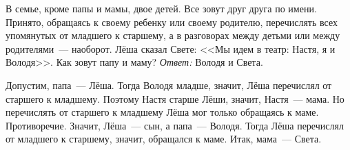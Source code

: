 \problem{}
В семье, кроме папы и мамы, двое детей.
Все зовут друг друга по имени.
Принято, обращаясь к своему ребенку или своему родителю, перечислять всех
упомянутых от младшего к старшему,
а в разговорах между детьми или между родителями~--- наоборот.
Лёша сказал Свете: <<Мы идем в театр: Настя, я и Володя>>.
Как зовут папу и маму?
\solution
\emph{Ответ:} Володя и Света.
\par
Допустим, папа~--- Лёша.
Тогда Володя младше, значит, Лёша перечислял от старшего к младшему.
Поэтому Настя старше Лёши, значит, Настя~--- мама.
Но перечислять от старшего к младшему Лёша мог только обращаясь к маме.
Противоречие. 
Значит, Лёша~--- сын, а папа~--- Володя.
Тогда Лёша перечислял от младшего к старшему, значит, обращался к маме.
Итак, мама~--- Света.
\endproblem
